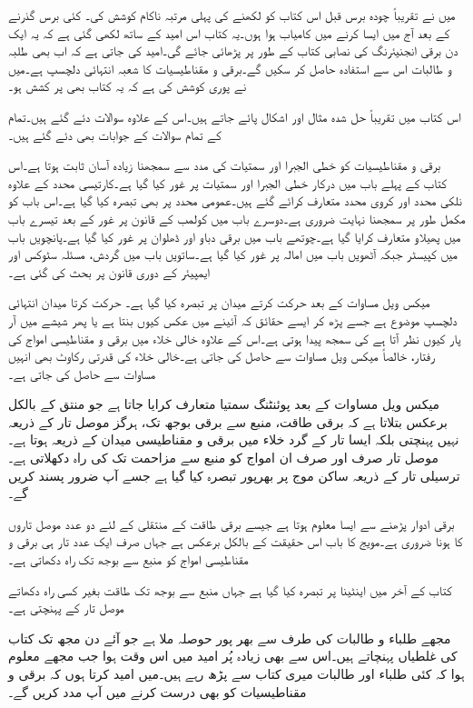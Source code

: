 میں نے تقریباً چودہ برس قبل اس کتاب کو لکھنے کی پہلی مرتبہ ناکام کوشش کی۔ کئی برس گذرنے کے بعد آج میں ایسا کرنے میں کامیاب ہوا ہوں۔یہ کتاب اس امید کے ساتھ لکھی گئی ہے کہ یہ ایک دن برقی انجنیئرنگ کی نصابی کتاب کے طور پر پڑھائی جائے گی۔امید کی جاتی ہے کہ اب بھی طلبہ و طالبات اس سے استفادہ حاصل کر سکیں گے۔برقی و مقناطیسیات کا شعبہ انتہائی دلچسپ ہے۔میں نے پوری کوشش کی ہے کہ یہ کتاب بھی پر کشش ہو۔

اس کتاب میں تقریباً  حل شدہ مثال اور  اشکال پائے جاتے ہیں۔اس کے علاوہ  سوالات دئے گئے ہیں۔تمام کے تمام سوالات کے جوابات بھی دئے گئے ہیں۔

برقی و مقناطیسیات کو خطی الجبرا اور سمتیات کی مدد سے سمجھنا زیادہ آسان ثابت ہوتا ہے۔اس کتاب کے پہلے باب میں درکار خطی الجبرا اور سمتیات پر غور کیا گیا ہے۔کارتیسی محدد کے علاوہ نلکی محدد اور کروی محدد متعارف کرائے گئے ہیں۔عمومی محدد پر بھی تبصرہ کیا گیا ہے۔اس باب کو مکمل طور پر سمجھنا نہایت ضروری ہے۔دوسرے باب میں کولمب کے قانون پر غور کے بعد تیسرے باب میں پھیلاو متعارف کرایا گیا ہے۔چوتھے باب میں برقی دباو اور ڈھلوان پر غور کیا گیا ہے۔پانچویں باب میں کپیسٹر جبکہ آٹھویں باب میں امالہ پر غور کیا گیا ہے۔ساتویں باب میں گردش، مسئلہ سٹوکس اور ایمپیئر کے دوری قانون پر بحث کی گئی ہے۔ 

میکس ویل مساوات کے بعد حرکت کرتے میدان پر تبصرہ کیا گیا ہے۔ حرکت کرتا میدان انتہائی دلچسپ موضوع ہے جسے پڑھ کر ایسے حقائق کہ  آئینے میں عکس کیوں بنتا ہے یا پھر شیشے میں آر پار کیوں نظر آتا ہے کی سمجھ پیدا ہوتی ہے۔اس کے علاوہ خالی خلاء میں برقی و مقناطیسی امواج کی رفتار، خالصاً میکس ویل مساوات سے حاصل کی جاتی ہے۔خالی خلاء کی قدرتی رکاوٹ بھی انہیں مساوات سے حاصل کی جاتی ہے۔

میکس ویل مساوات کے بعد پوئنٹنگ سمتیا متعارف کرایا جاتا ہے جو منتق کے بالکل برعکس بتلاتا ہے کہ برقی طاقت، منبع سے برقی بوجھ تک، ہرگز موصل تار کے ذریعہ نہیں پہنچتی بلکہ ایسا تار کے گرد خلاء میں برقی و مقناطیسی میدان کے ذریعہ ہوتا ہے۔موصل تار صرف اور صرف ان امواج کو منبع سے مزاحمت تک کی راہ دکھلاتی ہے۔ترسیلی تار کے ذریعہ ساکن موج پر بھرپور تبصرہ کیا گیا ہے جسے آپ ضرور پسند کریں گے۔

برقی ادوار پڑھنے سے ایسا معلوم ہوتا ہے جیسے برقی طاقت کے منتقلی کے لئے دو عدد موصل تاروں کا ہونا ضروری ہے۔مویج کا باب اس حقیقت کے بالکل برعکس ہے جہاں صرف ایک عدد تار  ہی برقی و مقناطیسی امواج کو منبع سے بوجھ تک راہ دکھاتی ہے۔

کتاب کے آخر میں اینٹینا پر تبصرہ کیا گیا ہے جہاں منبع سے بوجھ تک طاقت بغیر کسی راہ دکھاتے موصل تار کے پہنچتی ہے۔

مجھے طلباء و طالبات کی طرف سے بھر پور حوصلہ ملا ہے جو آئے دن مجھ تک کتاب کی غلطیاں پہنچاتے ہیں۔اس سے بھی زیادہ پُر امید میں اس وقت ہوا جب مجھے معلوم ہوا کہ کئی طلباء اور طالبات میری کتاب سے پڑھ رہے ہیں۔میں امید کرتا ہوں کہ برقی و مقناطیسیات کو بھی درست کرنے میں آپ مدد کریں گے۔

